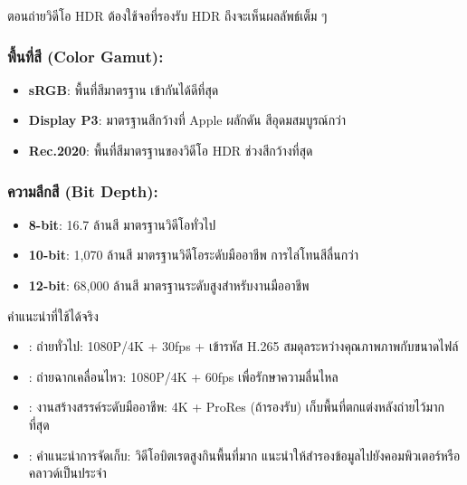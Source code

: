ตอนถ่ายวิดีโอ HDR ต้องใช้จอที่รองรับ HDR ถึงจะเห็นผลลัพธ์เต็ม ๆ


\subsubsection*{พื้นที่สี (Color Gamut):}

\begin{itemize}
  \item \textbf{sRGB}: พื้นที่สีมาตรฐาน เข้ากันได้ดีที่สุด
  \item \textbf{Display P3}: มาตรฐานสีกว้างที่ Apple ผลักดัน สีอุดมสมบูรณ์กว่า
  \item \textbf{Rec.2020}: พื้นที่สีมาตรฐานของวิดีโอ HDR ช่วงสีกว้างที่สุด
\end{itemize}

\subsubsection*{ความลึกสี (Bit Depth):}

\begin{itemize}
  \item \textbf{8-bit}: 16.7 ล้านสี มาตรฐานวิดีโอทั่วไป
  \item \textbf{10-bit}: 1,070 ล้านสี มาตรฐานวิดีโอระดับมืออาชีพ การไล่โทนสีลื่นกว่า
  \item \textbf{12-bit}: 68,000 ล้านสี มาตรฐานระดับสูงสำหรับงานมืออาชีพ
\end{itemize}

\begin{tcbinfo}{คำแนะนำที่ใช้ได้จริง}
\begin{itemize}
  \item : ถ่ายทั่วไป: 1080P/4K + 30fps + เข้ารหัส H.265 สมดุลระหว่างคุณภาพภาพกับขนาดไฟล์
  \item : ถ่ายฉากเคลื่อนไหว: 1080P/4K + 60fps เพื่อรักษาความลื่นไหล
  \item : งานสร้างสรรค์ระดับมืออาชีพ: 4K + ProRes (ถ้ารองรับ) เก็บพื้นที่ตกแต่งหลังถ่ายไว้มากที่สุด
  \item : คำแนะนำการจัดเก็บ: วิดีโอบิตเรตสูงกินพื้นที่มาก แนะนำให้สำรองข้อมูลไปยังคอมพิวเตอร์หรือคลาวด์เป็นประจำ
\end{itemize}

\end{tcbinfo}

